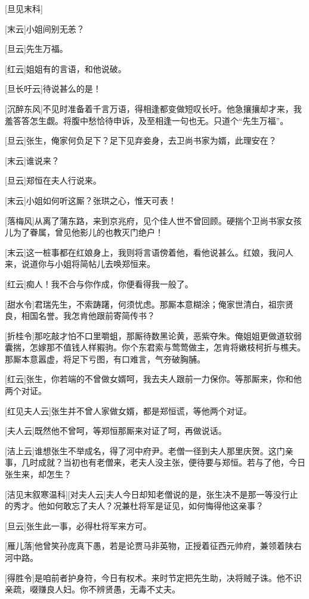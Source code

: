\documentclass{book}
\begin{document}
[旦见末科]

[末云]小姐间别无恙？

[旦云]先生万福。

[红云]姐姐有的言语，和他说破。

[旦长吁云]待说甚么的是！

[沉醉东风]不见时准备着千言万语，得相逢都变做短叹长吁。他急攘攘却才来，我羞答答怎生觑。将腹中愁恰待申诉，及至相逢一句也无。只道个``先生万福''。

[旦云]张生，俺家何负足下？足下见弃妾身，去卫尚书家为婿，此理安在？

[末云]谁说来？

[旦云]郑恒在夫人行说来。

[末云]小姐如何听这厮？张珙之心，惟天可表！

[落梅风]从离了蒲东路，来到京兆府，见个佳人世不曾回顾。硬揣个卫尚书家女孩儿为了眷属，曾见他影儿的也教灭门绝户！

[末云]这一桩事都在红娘身上，我则将言语傍着他，看他说甚么。红娘，我问人来，说道你与小姐将简帖儿去唤郑恒来。

[红云]痴人！我不合与你作成，你便看得我一般了。

[甜水令]君瑞先生，不索踌躇，何须忧虑。那厮本意糊涂；俺家世清白，祖宗贤良，相国名誉。我怎肯他跟前寄简传书？

[折桂令]那吃敲才怕不口里嚼蛆，那厮待数黑论黄，恶紫夺朱。俺姐姐更做道软弱囊揣，怎嫁那不值钱人样豭驹。你个东君索与莺莺做主，怎肯将嫩枝柯折与樵夫。那厮本意嚣虚，将足下亏图，有口难言，气夯破胸脯。

[红云]张生，你若端的不曾做女婿呵，我去夫人跟前一力保你。等那厮来，你和他两个对证。

[红见夫人云]张生并不曾人家做女婿，都是郑恒谎，等他两个对证。

[夫人云]既然他不曾呵，等郑恒那厮来对证了呵，再做说话。

[洁上云]谁想张生不举成名，得了河中府尹。老僧一径到夫人那里庆贺。这门亲事，几时成就？当初也有老僧来，老夫人没主张，便待要与郑恒。若与了他，今日张生来，却怎生？

[洁见末叙寒温科][对夫人云]夫人今日却知老僧说的是，张生决不是那一等没行止的秀才。他如何敢忘了夫人？况兼杜将军是证见，如何悔得他这亲事？

[旦云]张生此一事，必得杜将军来方可。

[雁儿落]他曾笑孙庞真下愚，若是论贾马非英物，正授着征西元帅府，兼领着陕右河中路。

[得胜令]是咱前者护身符，今日有权术。来时节定把先生助，决将贼子诛。他不识亲疏，啜赚良人妇。你不辨贤愚，无毒不丈夫。
\end{document}
